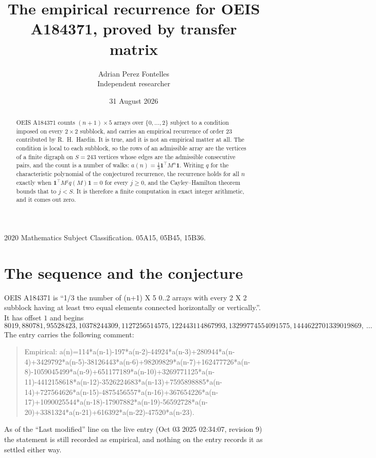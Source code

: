 \documentclass[11pt,a4paper]{article}
\title{The empirical recurrence for OEIS A184371, proved by transfer matrix}
\author{Adrian Perez Fontelles\\ \small Independent researcher}
\date{31 August 2026}
\theoremstyle{plain}
\theoremstyle{definition}
\begin{document}
\maketitle

\begin{abstract}
OEIS A184371 counts $(n+1)\times5$ arrays over $\{0,\dots,2\}$ subject to a condition imposed on
every $2\times2$ subblock, and carries an empirical recurrence of order $23$ contributed
by R.~H.~Hardin. It is true, and it is not an empirical matter at all. The condition is local
to each subblock, so the rows of an admissible array are the vertices of a finite digraph
on $S=243$ vertices whose edges are the admissible consecutive pairs, and the count is a
number of walks: $a(n)=\tfrac1{3}\mathbf{1}^{\!\top}M^{n}\mathbf{1}$. Writing $q$
for the characteristic polynomial of the conjectured recurrence, the recurrence holds for all
$n$ exactly when $\mathbf{1}^{\!\top}M^{j}q(M)\mathbf{1}=0$ for every $j\ge0$, and the
Cayley--Hamilton theorem bounds that to $j<S$. It is therefore a finite computation in exact
integer arithmetic, and it comes out zero.
\end{abstract}

\noindent\small 2020 Mathematics Subject Classification. 05A15, 05B45, 15B36.\normalsize

\section{The sequence and the conjecture}

OEIS A184371 is ``1/3 the number of (n+1) X 5 0..2 arrays with every 2 X 2 subblock having at least two equal elements connected horizontally or vertically.''. It has offset $1$ and begins
\[
8019, 880781, 95528423, 10378244309, 1127256514575, 122443114867993, 13299774554091575, 1444622701339019869,\ \dots
\]
The entry carries the following comment:
\begin{quote}\small
Empirical: a(n)=114*a(n-1)-197*a(n-2)-44924*a(n-3)+280944*a(n-4)+3429792*a(n-5)-38126443*a(n-6)+98209829*a(n-7)+162477726*a(n-8)-1059045499*a(n-9)+651177189*a(n-10)+3269771125*a(n-11)-4412158618*a(n-12)-3526224683*a(n-13)+7595898885*a(n-14)+727564626*a(n-15)-4875456557*a(n-16)+367654226*a(n-17)+1090025544*a(n-18)-17907882*a(n-19)-56592728*a(n-20)+3381324*a(n-21)+616392*a(n-22)-47520*a(n-23).
\end{quote}
As of the ``Last modified'' line on the live entry (Oct 03 2025 02:34:07, revision 9) the statement is
still recorded as empirical, and nothing on the entry records it as settled either way.
\end{document}
